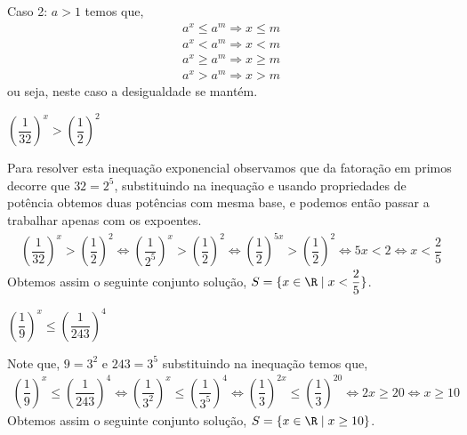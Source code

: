  Caso 2: $a > 1$ temos que,
  \begin{eqnarray*}
 a^x \leq a^m \Rightarrow x \leq m \\
 a^x < a^m \Rightarrow x < m \\
 a^x \geq a^m \Rightarrow x \geq m \\
 a^x > a^m \Rightarrow x > m
 \end{eqnarray*}
 ou seja, neste caso a desigualdade se mantém.
 
  \begin{exem}
  $\left( \dfrac{1}{32} \right)^x > \left( \dfrac{1}{2} \right)^2$
  
  Para resolver esta inequação exponencial observamos que da fatoração em primos decorre que $32= 2^5$, substituindo na inequação e usando propriedades de potência obtemos duas potências com mesma base, e podemos então passar a trabalhar apenas com os expoentes.
  \begin{eqnarray*}
  \left( \dfrac{1}{32} \right)^x > \left( \dfrac{1}{2} \right)^2 \Leftrightarrow
  \left( \dfrac{1}{2^5} \right)^x > \left( \dfrac{1}{2} \right)^2 \Leftrightarrow
  \left( \dfrac{1}{2} \right)^{5x} > \left( \dfrac{1}{2} \right)^2 
  \Leftrightarrow 5x < 2 \Leftrightarrow x < \dfrac{2}{5}
  \end{eqnarray*}
  Obtemos assim o seguinte conjunto solução, $S= \{x \in \R \mid x < \dfrac{2}{5}\}$.
  \end{exem}
  
  \begin{exem}
  $\left( \dfrac{1}{9} \right)^x \leq \left( \dfrac{1}{243} \right)^4$
  
  Note que, $9= 3^2$ e $243= 3^5$ substituindo na inequação temos que,
  \begin{eqnarray*}
  \left( \dfrac{1}{9} \right)^x \leq \left( \dfrac{1}{243} \right)^4 \Leftrightarrow
  \left( \dfrac{1}{3^2} \right)^x \leq \left( \dfrac{1}{3^5} \right)^4 \Leftrightarrow
  \left( \dfrac{1}{3} \right)^{2x} \leq \left( \dfrac{1}{3} \right)^{20}
  \Leftrightarrow 2x \geq 20 \Leftrightarrow x \geq 10
  \end{eqnarray*}
  Obtemos assim o seguinte conjunto solução, $S= \{x \in \R \mid x \geq 10 \}$.
  \end{exem}
  
